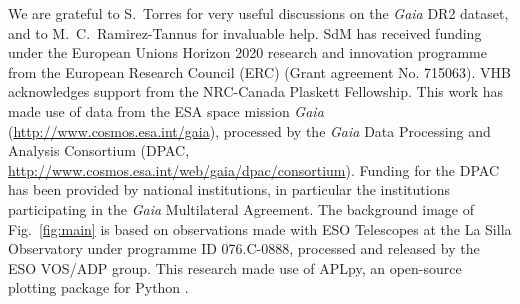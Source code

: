 \documentclass[apjl,twocolumn]{emulateapj}
\DeclareRobustCommand{\Figref}[1]{Fig.~\ref{#1}}
\begin{document}



\begin{acknowledgements}
  \small
  We are grateful to S.~Torres for 
  very useful discussions on the
  \emph{Gaia} DR2 dataset, and to M.~C.~Ramirez-Tannus for invaluable help.
  SdM has received funding under the European Unions Horizon 2020 research and innovation programme from the European Research
  Council (ERC) (Grant agreement No. 715063). VHB acknowledges support from the NRC-Canada Plaskett Fellowship.
  This work has made use of data from the ESA space mission \emph{Gaia} (\url{http://www.cosmos.esa.int/gaia}), processed by the \emph{Gaia} Data Processing and Analysis Consortium (DPAC, \url{http://www.cosmos.esa.int/web/gaia/dpac/consortium}). Funding for the DPAC has been provided by national institutions, in particular the institutions participating in the \emph{Gaia} Multilateral Agreement. 
  The background image of \Figref{fig:main} is based on observations
  made with ESO Telescopes at the La Silla Observatory under programme
  ID 076.C-0888, processed and released by the ESO VOS/ADP group.
  This research made use of APLpy, an open-source plotting package for Python \citep[][]{robitaille:12}.
\end{acknowledgements}
\end{document}
